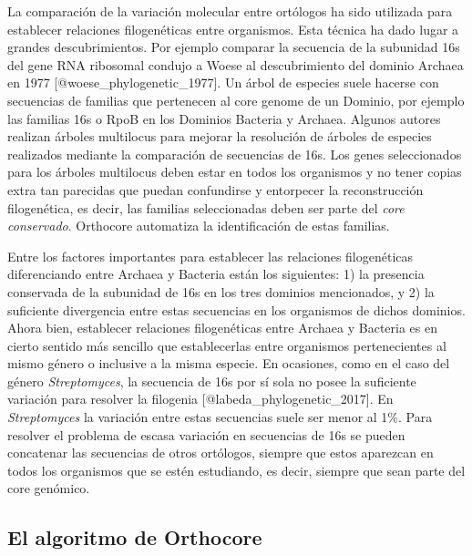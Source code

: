 \documentclass[]{article}
\begin{document}
La comparación de la variación molecular entre ortólogos ha sido
utilizada para establecer relaciones filogenéticas entre organismos.
Esta técnica ha dado lugar a grandes descubrimientos. Por ejemplo
comparar la secuencia de la subunidad 16s del gene RNA ribosomal condujo
a Woese al descubrimiento del dominio Archaea en 1977
{[}@woese\_phylogenetic\_1977{]}. Un árbol de especies suele hacerse con
secuencias de familias que pertenecen al core genome de un Dominio, por
ejemplo las familias 16s o RpoB en los Dominios Bacteria y Archaea.
Algunos autores realizan árboles multilocus para mejorar la resolución
de árboles de especies realizados mediante la comparación de secuencias
de 16s. Los genes seleccionados para los árboles multilocus deben estar
en todos los organismos y no tener copias extra tan parecidas que puedan
confundirse y entorpecer la reconstrucción filogenética, es decir, las
familias seleccionadas deben ser parte del \emph{core conservado}.
Orthocore automatiza la identificación de estas familias.

Entre los factores importantes para establecer las relaciones
filogenéticas diferenciando entre Archaea y Bacteria están los
siguientes: 1) la presencia conservada de la subunidad de 16s en los
tres dominios mencionados, y 2) la suficiente divergencia entre estas
secuencias en los organismos de dichos dominios. Ahora bien, establecer
relaciones filogenéticas entre Archaea y Bacteria es en cierto sentido
más sencillo que establecerlas entre organismos pertenecientes al mismo
género o inclusive a la misma especie. En ocasiones, como en el caso del
género \emph{Streptomyces}, la secuencia de 16s por sí sola no posee la
suficiente variación para resolver la filogenia
{[}@labeda\_phylogenetic\_2017{]}. En \emph{Streptomyces} la variación
entre estas secuencias suele ser menor al 1\%. Para resolver el problema
de escasa variación en secuencias de 16s se pueden concatenar las
secuencias de otros ortólogos, siempre que estos aparezcan en todos los
organismos que se estén estudiando, es decir, siempre que sean parte del
core genómico.

\subsection{El algoritmo de Orthocore}\label{el-algoritmo-de-orthocore}
\end{document}

